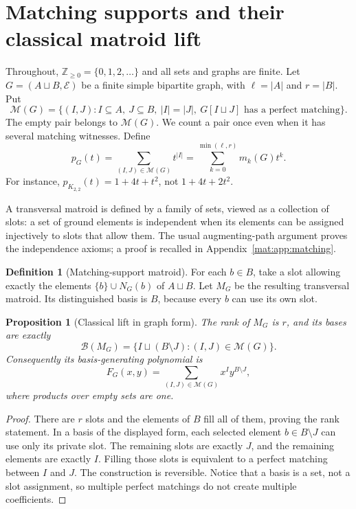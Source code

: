 \documentclass[11pt]{article}
\numberwithin{equation}{section}
\newtheorem{proposition}[theorem]{Proposition}
\theoremstyle{definition}
\newtheorem{definition}[theorem]{Definition}
\newcommand{\N}{\mathbb Z_{\geq0}}
\newcommand{\PM}{\mathcal M}
\newcommand{\cB}{\mathcal B}
\begin{document}
\section{Matching supports and their classical matroid lift}
\label{mat:sec:lift}
Throughout, $\N=\{0,1,2,\ldots\}$ and all sets and graphs are finite.
Let $G=(A\sqcup B,\mathcal E)$ be a finite simple bipartite graph, with
$\ell=|A|$ and $r=|B|$. Put
\[
\PM(G)=\{(I,J): I\subseteq A,\ J\subseteq B,\ |I|=|J|,
                   \ G[I\sqcup J]\text{ has a perfect matching}\}.
\]
The empty pair belongs to $\PM(G)$. We count a pair once even when it has
several matching witnesses. Define
\begin{equation}
 p_G(t)=\sum_{(I,J)\in\PM(G)}t^{|I|}
       =\sum_{k=0}^{\min(\ell,r)}m_k(G)t^k.
\label{mat:eq:pG}
\end{equation}
For instance, $p_{K_{2,2}}(t)=1+4t+t^2$, not $1+4t+2t^2$.

A transversal matroid is defined by a family of sets, viewed as a collection
of slots: a set of ground elements is independent when its elements can be
assigned injectively to slots that allow them. The usual augmenting-path
argument proves the independence axioms; a proof is recalled in
Appendix~\ref{mat:app:matching}.

\begin{definition}[Matching-support matroid]
For each $b\in B$, take a slot allowing exactly the elements
$\{b\}\cup N_G(b)$ of $A\sqcup B$. Let $M_G$ be the resulting transversal
matroid. Its distinguished basis is $B$, because every $b$ can use its own
slot.
\end{definition}

\begin{proposition}[Classical lift in graph form]\label{mat:prop:lift}
The rank of $M_G$ is $r$, and its bases are exactly
\begin{equation}
 \cB(M_G)=\{I\sqcup(B\setminus J):(I,J)\in\PM(G)\}.
\label{mat:eq:bases}
\end{equation}
Consequently its basis-generating polynomial is
\begin{equation}
 F_G(x,y)=\sum_{(I,J)\in\PM(G)}x^I y^{B\setminus J},
\label{mat:eq:FG}
\end{equation}
where products over empty sets are one.
\end{proposition}
\begin{proof}
There are $r$ slots and the elements of $B$ fill all of them, proving the
rank statement. In a basis of the displayed form, each selected element
$b\in B\setminus J$ can use only its private slot. The remaining slots are
exactly $J$, and the remaining elements are exactly $I$. Filling those slots
is equivalent to a perfect matching between $I$ and $J$. The construction is
reversible. Notice that a basis is a set, not a slot assignment, so multiple
perfect matchings do not create multiple coefficients.
\end{proof}
\end{document}
